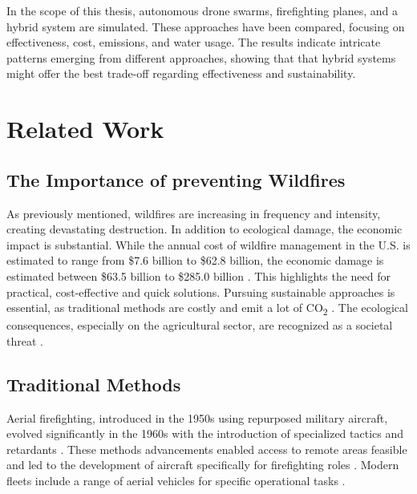 \documentclass[11pt, a4paper]{article}
\begin{document}
In the scope of this thesis, autonomous drone swarms, firefighting planes,  and a hybrid system are simulated. These approaches have been compared, focusing on effectiveness, cost, emissions, and water usage. The results indicate intricate patterns emerging from different approaches, showing that that hybrid systems might offer the best trade-off regarding effectiveness and sustainability.

\section{Related Work}

\subsection{The Importance of preventing Wildfires}
As previously mentioned, wildfires are increasing in frequency and intensity, creating devastating destruction. In addition to ecological damage, the economic impact is substantial. While the annual cost of wildfire management in the U.S. is estimated to range from \$7.6 billion to \$62.8 billion, the economic damage is estimated between \$63.5 billion to \$285.0 billion \citep{Afghah2019}. This highlights the need for practical, cost-effective and quick solutions. Pursuing sustainable approaches is essential, as traditional methods are costly and emit a lot of CO\textsubscript{2} \citep{Saffre2022}. The ecological consequences, especially on the agricultural sector, are recognized as a societal threat \citep{grassland_Wildfires,IPCC2023}. 

\subsection{Traditional Methods}

Aerial firefighting, introduced in the 1950s using repurposed military aircraft, evolved significantly in the 1960s with the introduction of specialized tactics and retardants \citep{janney2012airtankers,struminskaFlightPerformanceAnalysis2024}. These methods advancements enabled access to remote areas feasible and led to the development of aircraft specifically for firefighting roles \citep{struminskaFlightPerformanceAnalysis2024,LockheedSuperHercules}. Modern fleets include a range of aerial vehicles for specific operational tasks \citep{FleetInformationFirefighting}. 
\end{document}
